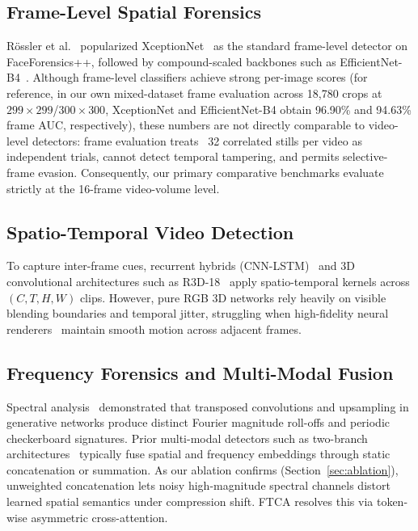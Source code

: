 \documentclass[conference,10pt]{IEEEtran}
\begin{document}
\subsection{Frame-Level Spatial Forensics}
R\"ossler et al.~\cite{roessler2019faceforensics} popularized XceptionNet~\cite{chollet2017xception} as the standard frame-level detector on FaceForensics++, followed by compound-scaled backbones such as EfficientNet-B4~\cite{tan2019efficientnet}. Although frame-level classifiers achieve strong per-image scores (for reference, in our own mixed-dataset frame evaluation across 18,780 crops at $299\times299$/$300\times300$, XceptionNet and EfficientNet-B4 obtain 96.90\% and 94.63\% frame AUC, respectively), these numbers are not directly comparable to video-level detectors: frame evaluation treats ~32 correlated stills per video as independent trials, cannot detect temporal tampering, and permits selective-frame evasion. Consequently, our primary comparative benchmarks evaluate strictly at the 16-frame video-volume level.

\subsection{Spatio-Temporal Video Detection}
To capture inter-frame cues, recurrent hybrids (CNN-LSTM)~\cite{guera2018deepfake} and 3D convolutional architectures such as R3D-18~\cite{tran2018closer} apply spatio-temporal kernels across $(C, T, H, W)$ clips. However, pure RGB 3D networks rely heavily on visible blending boundaries and temporal jitter, struggling when high-fidelity neural renderers~\cite{thies2019deferred,li2020celeb} maintain smooth motion across adjacent frames.

\subsection{Frequency Forensics and Multi-Modal Fusion}
Spectral analysis~\cite{frank2020leveraging,durall2020watch} demonstrated that transposed convolutions and upsampling in generative networks produce distinct Fourier magnitude roll-offs and periodic checkerboard signatures. Prior multi-modal detectors such as two-branch architectures~\cite{masi2020two} typically fuse spatial and frequency embeddings through static concatenation or summation. As our ablation confirms (Section~\ref{sec:ablation}), unweighted concatenation lets noisy high-magnitude spectral channels distort learned spatial semantics under compression shift. FTCA resolves this via token-wise asymmetric cross-attention.
\end{document}
